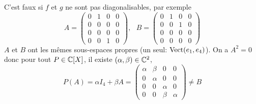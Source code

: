 \documentclass[12pt]{article}
\begin{document}
\begin{remark}
	C'est faux si $f$ et $g$ ne sont pas diagonalisables, par exemple 
	\begin{equation}
		A=\begin{pmatrix}
			0&1&0&0\\
			0&0&0&0\\
			0&0&0&0\\
			0&0&1&0
		\end{pmatrix},~~~B=\begin{pmatrix}
			0&1&0&0\\
			0&0&1&0\\
			0&0&0&0\\
			0&0&0&0
		\end{pmatrix}
	\end{equation}
	$A$ et $B$ ont les mêmes sous-espaces propres  (un seul: $\operatorname{Vect}(e_{1},e_{4})$). On a $A^{2}=0$ donc pour tout $P\in\mathbb{C}[X]$, il existe $(\alpha,\beta)\in\mathbb{C}^{2}$,
	\begin{equation}
		P(A)=\alpha I_{4}+\beta A=\begin{pmatrix}
			\alpha&\beta&0&0\\
			0&\alpha&0&0\\
			0&0&\alpha&0\\
			0&0&\beta&\alpha
		\end{pmatrix}\neq B
	\end{equation}
\end{remark}
\end{document}
